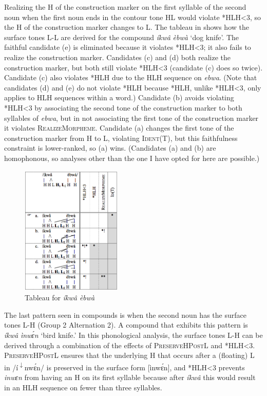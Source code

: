 \documentclass[output=paper]{langscibook}
\begin{document}
Realizing the H of the construction marker on the first syllable of the second noun when the first noun ends in the contour tone HL would violate *HLH<3, so the H of the construction marker changes to L. The tableau in  shows how the surface tones L-L are derived for the compound \textit{íkwâ} \textit{èbwà} ‘dog knife’.
The faithful candidate (e) is eliminated because it violates *HLH<3; it also fails to realize the construction marker. Candidates (c) and (d) both realize the construction marker, but both still violate *HLH<3 (candidate (c) does so twice). Candidate (c) also violates *HLH due to the HLH sequence on \textit{ebwa}. (Note that candidates (d) and (e) do not violate *HLH because *HLH, unlike *HLH<3, only applies to HLH sequences within a word.) Candidate (b) avoids violating *HLH<3 by associating the second tone of the construction marker to both syllables of \textit{ebwa}, but in not associating the first tone of the construction marker it violates \textsc{RealizeMorpheme}. Candidate (a) changes the first tone of the construction marker from H to L, violating \textsc{Ident(T)}, but this faithfulness constraint is lower-ranked, so (a) wins. (Candidates (a) and (b) are homophonous, so analyses other than the one I have opted for here are possible.)   
  
\begin{figure}
\includegraphics[width=48mm]{figures/glewwe-img8.png}
\caption{Tableau for \textit{íkwâ èbwà}\label{fig:glewwe:9}}
\end{figure}

The last pattern seen in compounds is when the second noun has the surface tones L-H (Group 2 Alternation 2). A compound that exhibits this pattern is \textit{íkwâ} \textit{ìnwɛ́n} ‘bird knife.’ In this phonological analysis, the surface tones L-H can be derived through a combination of the effects of \textsc{PreserveHPostL} and *HLH<3. \textsc{PreserveHPostL} ensures that the underlying H that occurs after a (floating) L in /í\textsuperscript{$\downarrow$}nwɛ́n/ is preserved in the surface form [ìnwɛ́n], and *HLH<3 prevents \textit{inwɛn} from having an H on its first syllable because after \textit{íkwâ} this would result in an HLH sequence on fewer than three syllables.
\end{document}

